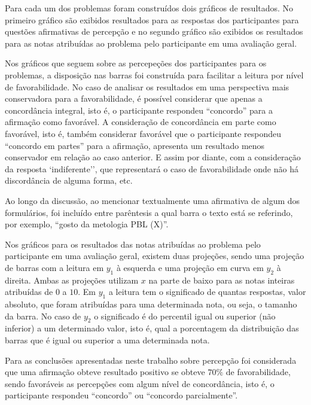 


Para cada um dos problemas foram construídos dois gráficos de resultados.
No primeiro gráfico são exibidos resultados para as respostas
dos participantes para questões afirmativas de percepção e
no segundo gráfico são exibidos os resultados para as notas atribuídas
ao problema pelo participante em uma avaliação geral.

Nos gráficos que seguem sobre as percepeções dos participantes para os
problemas, a disposição nas barras
foi construída para facilitar a leitura por nível de favorabilidade.
No caso de analisar os resultados em uma perspectiva mais conservadora
para a favorabilidade, é possível considerar que apenas a concordância
integral, isto é, o participante respondeu ``concordo'' para
a afirmação como favorável.
A consideração de concordância em parte como favorável,
isto é, também considerar favorável que
o participante respondeu ``concordo em partes'' para a afirmação,
apresenta um resultado menos conservador em relação ao caso anterior.
E assim por diante, com a consideração da resposta `indiferente'', que
representará o caso de favorabilidade onde não há discordância de alguma forma,
etc.

Ao longo da discussão, ao mencionar textualmente uma afirmativa de
algum dos formulários, foi incluído entre parêntesis a qual barra o texto
está se referindo, por exemplo, ``gosto da metologia PBL (X)''.

Nos gráficos para os resultados das notas atribuídas
ao problema pelo participante em uma avaliação geral,
existem duas projeções, sendo uma projeção de barras com
a leitura em $y_1$ à esquerda e uma projeção em curva
em $y_2$ à direita.
Ambas as projeções utilizam $x$ na parte de baixo para as notas
inteiras atribuídas de $0$ a $10$.
Em $y_1$ a leitura tem o significado de quantas respostas, valor absoluto,
que foram atribuídas para uma determinada nota, ou seja,
o tamanho da barra.
No caso de $y_2$ o significado é do percentil igual ou superior
(não inferior) a um determinado valor, isto é,
qual a porcentagem da distribuição das barras que é igual ou superior
a uma determinada nota.

Para as conclusões apresentadas neste trabalho sobre percepção foi
considerada que uma afirmação obteve resultado positivo
se obteve $70\%$ de favorabilidade,
sendo favoráveis as percepções com algum nível de concordância,
isto é, o participante respondeu ``concordo''
ou ``concordo parcialmente''.

